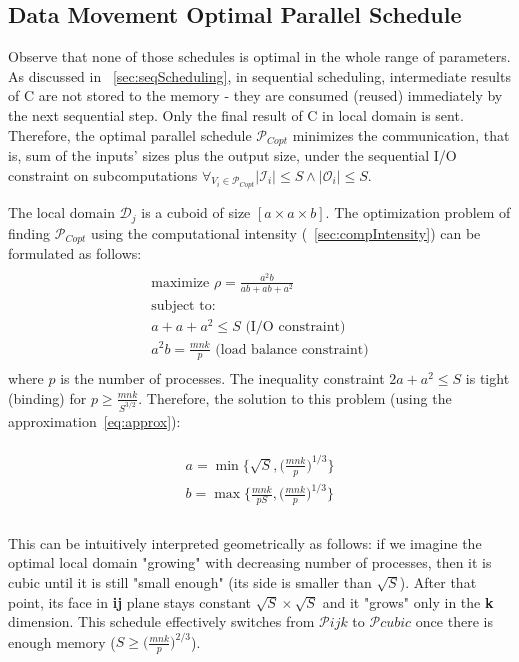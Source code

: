 \documentclass[sigplan,review,anonymous]{acmart}\settopmatter{printfolios=true,printccs=false,printacmref=false}
\begin{document}
\subsection{Data Movement Optimal Parallel Schedule}
\label{sec:parScheduling}
Observe that none of those schedules is optimal in the whole range of 
parameters.
As discussed in ~\cref{sec:seqScheduling}, in sequential 
scheduling, 
intermediate results of C are not stored to the memory - they are 
consumed 
(reused) immediately by the next sequential step. Only the final 
result of C in 
local domain is sent. Therefore, the optimal parallel schedule 
$\mathcal{P}_{Copt}$
minimizes the 
communication, that is, sum of the inputs' sizes plus the output 
size, under 
the sequential I/O constraint on subcomputations $\forall_{V_i \in 
\mathcal{P}_{Copt}} |\mathcal{I}_i| \le S \land |\mathcal{O}_i| \le S$.

The local domain $\mathcal{D}_j$ is a cuboid of size $[a \times a \times b]$. 
The optimization problem of finding $\mathcal{P}_{Copt}$
using the 
computational intensity (~\cref{sec:compIntensity}) can be 
formulated as 
follows:
\begin{multline}
\label{eq:tileEq}
\\
\text{maximize } \rho = \frac{a^2b}{ab + ab + a^2}\\
\text{subject to: } \\
a + a + a^2 \le S \text{ (I/O constraint)} \\
a^2b = \frac{mnk}{p} \text{ (load balance constraint)} \\ 
\end{multline}
where $p$ is the number of processes. The inequality constraint $2a + 
a^2 \le 
S$ is tight (binding) for $p \ge \frac{mnk}{S^{3/2}}$. Therefore, the solution 
to this problem (using the 
approximation~\ref{eq:approx}):

\begin{multline}
\\
a = \min\Big\{\sqrt{S}, \Big(\frac{mnk}{p}\Big)^{1/3} \Big\}\\
b = \max\Big\{\frac{mnk}{pS}, \Big(\frac{mnk}{p}\Big)^{1/3} \Big\}\\
\label{eq:optTileShape}
\end{multline}
\\

This can be intuitively interpreted geometrically as follows: if we 
imagine the 
optimal local domain "growing" with decreasing number of processes, 
then it is 
cubic until it is still "small enough" (its side is smaller than 
$\sqrt{S}$). 
After that point, its face in \textbf{ij} plane stays constant 
$\sqrt{S} \times 
\sqrt{S}$ and it "grows" 
only in the \textbf{k} dimension. This schedule effectively switches 
from $\mathcal{P}ijk$ to $\mathcal{P}cubic$ once there is enough 
memory ($S \ge \big(\frac{mnk}{p}\big)^{2/3}$).
\end{document}
